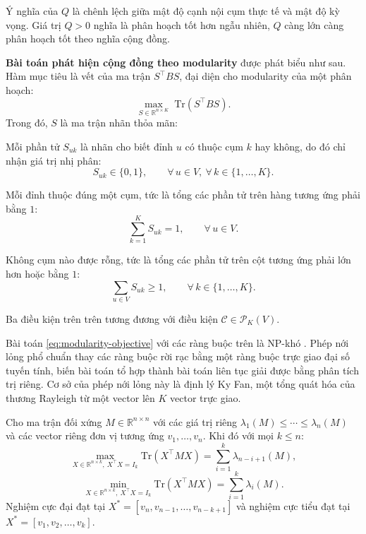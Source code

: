 Ý nghĩa của $Q$ là chênh lệch giữa mật độ cạnh nội cụm thực tế và mật độ kỳ vọng. Giá trị $Q > 0$ nghĩa là phân hoạch tốt hơn ngẫu nhiên, $Q$ càng lớn càng phân hoạch tốt theo nghĩa cộng đồng.

\clearpage

\textbf{Bài toán phát hiện cộng đồng theo modularity} được phát biểu như sau. Hàm mục tiêu là vết của ma trận $S^\top B S$, đại diện cho modularity của một phân hoạch:
\begin{equation}
\label{eq:modularity-objective}
    \max_{S \in \mathbb{R}^{n \times K}} \; \mathrm{Tr}(S^\top B S).
\end{equation}
Trong đó, $S$ là ma trận nhãn thỏa mãn:

Mỗi phần tử $S_{uk}$ là nhãn cho biết đỉnh $u$ có thuộc cụm $k$ hay không, do đó chỉ nhận giá trị nhị phân:
\begin{equation}
\label{eq:mod-binary}
    S_{uk} \in \{0, 1\}, \qquad \forall\, u \in V,\ \forall\, k \in \{1, \ldots, K\}.
\end{equation}

Mỗi đỉnh thuộc đúng một cụm, tức là tổng các phần tử trên hàng tương ứng phải bằng $1$:
\begin{equation}
\label{eq:mod-row}
    \sum_{k=1}^K S_{uk} = 1, \qquad \forall\, u \in V.
\end{equation}

Không cụm nào được rỗng, tức là tổng các phần tử trên cột tương ứng phải lớn hơn hoặc bằng $1$:
\begin{equation}
\label{eq:mod-col}
    \sum_{u \in V} S_{uk} \geq 1, \qquad \forall\, k \in \{1, \ldots, K\}.
\end{equation}

Ba điều kiện trên trên tương đương với điều kiện $\mathcal{C} \in \mathcal{P}_K(V)$.

Bài toán \eqref{eq:modularity-objective} với các ràng buộc trên là NP-khó \cite{newman2006}. Phép nới lỏng phổ chuẩn thay các ràng buộc rời rạc bằng một ràng buộc trực giao đại số tuyến tính, biến bài toán tổ hợp thành bài toán liên tục giải được bằng phân tích trị riêng. Cơ sở của phép nới lỏng này là định lý Ky Fan, một tổng quát hóa của thương Rayleigh từ một vector lên $K$ vector trực giao.

\begin{theorem}
\label{thm:ky-fan}
Cho ma trận đối xứng $M \in \mathbb{R}^{n \times n}$ với các giá trị riêng $\lambda_1(M) \leq \cdots \leq \lambda_n(M)$ và các vector riêng đơn vị tương ứng $v_1, \ldots, v_n$. Khi đó với mọi $k \leq n$:
\[
    \max_{X \in \mathbb{R}^{n \times k},\ X^\top X = I_k} \mathrm{Tr}(X^\top M X) = \sum_{i=1}^k \lambda_{n-i+1}(M),
\]
\[
    \min_{X \in \mathbb{R}^{n \times k},\ X^\top X = I_k} \mathrm{Tr}(X^\top M X) = \sum_{i=1}^k \lambda_i(M).
\]
Nghiệm cực đại đạt tại $X^* = [v_n, v_{n-1}, \ldots, v_{n-k+1}]$ và nghiệm cực tiểu đạt tại $X^* = [v_1, v_2, \ldots, v_k]$.
\end{theorem}

